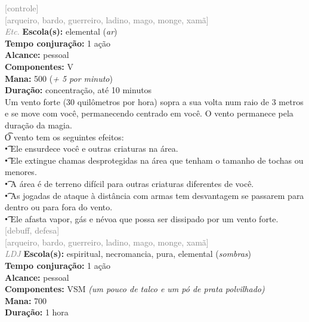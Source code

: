 \documentclass{RPG_Adventure}[2021/10/20]
\begin{document}
{\scriptsize \textcolor{gray}{[controle]\\}}
{\scriptsize \textcolor{gray}{[arqueiro, bardo, guerreiro, ladino, mago, monge, xamã]\\}}
{\tiny \textcolor{gray}{\textit{Etc.}}}\jump{}
{\small \t \textbf{Escola(s):} elemental (\textit{ar})\\\t \textbf{Tempo conjuração:} 1 ação\\\t \textbf{Alcance:} pessoal\\\t \textbf{Componentes:} V\\\t \textbf{Mana:} 500 (\textit{+ 5 por minuto})\\\t \textbf{Duração:} concentração, até 10 minutos\\}
{\normalsize Um vento forte (30 quilômetros por hora) sopra a sua volta num raio de 3 metros e se move com você, permanecendo centrado em você. O vento permanece pela duração da magia.\\\t O vento tem os seguintes efeitos:\\\t • Ele ensurdece você e outras criaturas na área.\\\t • Ele extingue chamas desprotegidas na área que tenham o tamanho de tochas ou menores.\\\t • A área é de terreno difícil para outras criaturas diferentes de você.\\\t • As jogadas de ataque à distância com armas tem desvantagem se passarem para dentro ou para fora do vento.\\\t • Ele afasta vapor, gás e névoa que possa ser dissipado por um vento forte.\\}
{\scriptsize \textcolor{gray}{[debuff, defesa]\\}}
{\scriptsize \textcolor{gray}{[arqueiro, bardo, guerreiro, ladino, mago, monge, xamã]\\}}
{\tiny \textcolor{gray}{\textit{LDJ}}}\jump{}
{\small \t \textbf{Escola(s):} espiritual, necromancia, pura, elemental (\textit{sombras})\\\t \textbf{Tempo conjuração:} 1 ação\\\t \textbf{Alcance:} pessoal\\\t \textbf{Componentes:} VSM \textit{(um pouco de talco e um pó de prata polvilhado)}\\\t \textbf{Mana:} 700\\\t \textbf{Duração:} 1 hora\\}
\end{document}
